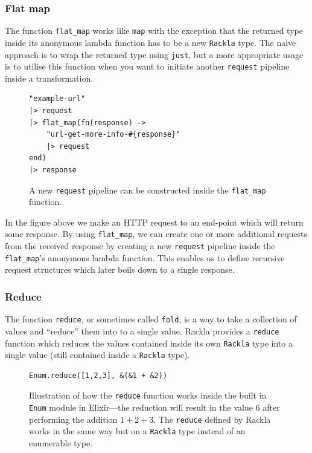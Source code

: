 \documentclass{cslthse-msc}
\begin{document}
\subsubsection{Flat map}
The function \lstinline{flat_map} works like \lstinline{map} with the exception that the returned type inside its anonymous lambda function has to be a new \lstinline{Rackla} type. The naive approach is to wrap the returned type using \lstinline{just}, but a more appropriate usage is to utilise this function when you want to initiate another \lstinline{request} pipeline inside a transformation.

\begin{figure}[H]
  \centering
\begin{lstlisting}[breaklines=true,frame=single]
"example-url"
|> request
|> flat_map(fn(response) -> 
	"url-get-more-info-#{response}" 
	|> request 
end)
|> response
\end{lstlisting}
  \caption{A new \lstinline{request} pipeline can be constructed inside the \lstinline{flat_map} function.}
\end{figure}

In the figure above we make an HTTP request to an end-point which will return some response. By using \lstinline{flat_map}, we can create one or more additional requests from the received response by creating a new \lstinline{request} pipeline inside the \lstinline{flat_map}'s anonymous lambda function. This enables us to define recursive request structures which later boils down to a single response.

\subsubsection{Reduce}
The function \lstinline{reduce}, or sometimes called \lstinline{fold}, is a way to take a collection of values and \enquote{reduce} them into to a single value. Rackla provides a \lstinline{reduce} function which reduces the values contained inside its own \lstinline{Rackla} type into a single value (still contained inside a \lstinline{Rackla} type).

\begin{figure}[H]
  \centering
\begin{lstlisting}[breaklines=true,frame=single]
Enum.reduce([1,2,3], &(&1 + &2))
\end{lstlisting}
  \caption{Illustration of how the \lstinline{reduce} function works inside the built in \lstinline{Enum} module in Elixir---the reduction will result in the value $6$ after performing the addition $1+2+3$. The \lstinline{reduce} defined by Rackla works in the same way but on a \lstinline{Rackla} type instead of an enumerable type.}
\end{figure}
\end{document}
